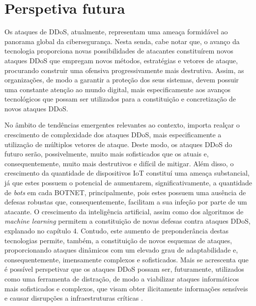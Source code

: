 \section{Perspetiva futura}
Os ataques de DDoS, atualmente, representam uma ameaça formidável ao panorama global da cibersegurança. Nesta senda, cabe notar que, o avanço da tecnologia proporciona novas possibilidades de atacantes constituírem novos ataques DDoS que empregam novos métodos, estratégias e vetores de ataque, procurando construir uma ofensiva progressivamente mais destrutiva. Assim, as organizações, de modo a garantir a proteção dos seus sistemas, devem possuir uma constante atenção ao mundo digital, mais especificamente aos avanços tecnológicos que possam ser utilizados para a constituição e concretização de novos ataques DDoS.


No âmbito de tendências emergentes relevantes ao contexto, importa realçar o crescimento de complexidade dos ataques DDoS, mais especificamente a utilização de múltiplos vetores de ataque. Deste modo, os ataques DDoS do futuro serão, possivelmente, muito mais sofisticados que os atuais e, consequentemente, muito mais destrutivos e difícil de mitigar. Além disso, o crescimento da quantidade de dispositivos IoT constituí uma ameaça substancial, já que estes possuem o potencial de aumentarem, significativamente, a quantidade de \textit{bots} em cada BOTNET, principalmente, pois estes possuem uma ausência de defesas robustas que, consequentemente, facilitam a sua infeção por parte de um atacante. O crescimento da inteligência artificial, assim como dos algoritmos de \textit{machine learning} permitem a constituição de novas defesas contra ataques DDoS, explanado no capítulo 4. Contudo, este aumento de preponderância destas tecnologias permite, também, a constituição de novos esquemas de ataques, proporcionando ataques dinâmicos com um elevado grau de adaptabilidade e, consequentemente, imensamente complexos e sofisticados. Mais se acrescenta que é possível perspetivar que os ataques DDoS possam ser, futuramente, utilizados como uma ferramenta de distração, de modo a viabilizar ataques informáticos mais sofisticados e complexos, que visam obter ilicitamente informações sensíveis e causar disrupções a infraestruturas críticas \cite{microminderscs_future_trends}.
